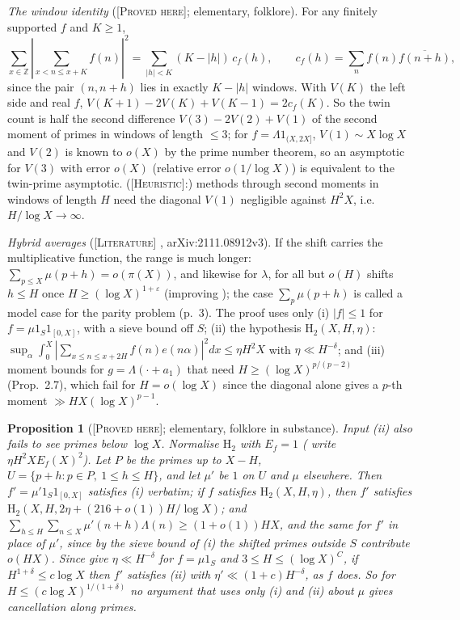 \documentclass[11pt]{amsart}
\newtheorem{proposition}[theorem]{Proposition}
\theoremstyle{definition}
\theoremstyle{remark}
\newcommand{\lbl}[1]{\textup{\textsc{[#1]}}}
\begin{document}
\emph{The window identity} (\lbl{Proved here}; elementary, folklore). For any
finitely supported $f$ and $K\ge1$,
\begin{equation}\label{eq:window}
\sum_{x\in\mathbb Z}\left|\sum_{x<n\le x+K}f(n)\right|^2=\sum_{|h|<K}(K-|h|)\,c_f(h),\qquad
c_f(h)=\sum_nf(n)\overline{f(n+h)},
\end{equation}
since the pair $(n,n+h)$ lies in exactly $K-|h|$ windows. With $V(K)$ the left
side and real $f$, $V(K+1)-2V(K)+V(K-1)=2c_f(K)$. So the twin count is half the
second difference $V(3)-2V(2)+V(1)$ of the second moment of primes in windows
of length $\le3$; for $f=\Lambda1_{(X,2X]}$, $V(1)\sim X\log X$ and $V(2)$ is known to $o(X)$ by the
prime number theorem, so an asymptotic for
$V(3)$ with error $o(X)$ (relative error $o(1/\log X)$) is equivalent to the
twin-prime asymptotic. (\lbl{Heuristic}:) methods through second moments in windows of length $H$
need the diagonal $V(1)$ negligible against $H^2X$, i.e.\ $H/\log X\to\infty$.

\emph{Hybrid averages} (\lbl{Literature} \cite[Thm.~1.2, Cor.~1.4, Prop.~3.2,
\S4]{LT22}, arXiv:2111.08912v3). If the shift carries the multiplicative
function, the range is much longer: $\sum_{p\le X}\mu(p+h)=o(\pi(X))$, and
likewise for $\lambda$, for all but $o(H)$ shifts $h\le H$ once $H\ge(\log
X)^{1+\varepsilon}$ (improving \cite{Li21}); the case $\sum_p\mu(p+h)$ is called a
model case for the parity problem (p.~3). The proof uses only (i) $|f|\le1$ for
$f=\mu1_S1_{[0,X]}$, with a sieve bound off $S$; (ii) the hypothesis
$\mathrm{H}_2(X,H,\eta)$:
$\sup_\alpha\int_0^X|\sum_{x\le n\le x+2H}f(n)e(n\alpha)|^2dx\le\eta H^2X$ with
$\eta\ll H^{-\delta}$; and (iii) moment bounds for $g=\Lambda(\cdot+a_1)$ that need
$H\ge(\log X)^{p/(p-2)}$ (Prop.~2.7), which fail for $H=o(\log X)$ since the
diagonal alone gives a $p$-th moment $\gg HX(\log X)^{p-1}$.

\begin{proposition}[\lbl{Proved here}; elementary, folklore in substance]\label{prop:lt22}
Input (ii) also fails to see primes below $\log X$. Normalise $\mathrm{H}_2$
with $E_f=1$ (\cite{LT22} write $\eta H^2XE_f(X)^2$). Let $P$ be the primes up to
$X-H$, $U=\{p+h:p\in P,\ 1\le h\le H\}$, and let $\mu'$ be $1$ on $U$ and $\mu$
elsewhere. Then $f'=\mu'1_S1_{[0,X]}$ satisfies (i) verbatim; if $f$ satisfies
$\mathrm{H}_2(X,H,\eta)$, then $f'$ satisfies $\mathrm{H}_2(X,H,2\eta+(216+o(1))H/\log X)$;
and $\sum_{h\le H}\sum_{n\le X}\mu'(n+h)\Lambda(n)\ge(1+o(1))HX$, and the same for
$f'$ in place of $\mu'$, since by the sieve bound of (i) the shifted primes
outside $S$ contribute $o(HX)$. Since
\cite[Prop.~2.1, Remark~2.2]{LT22} give $\eta\ll H^{-\delta}$ for $f=\mu1_S$ and
$3\le H\le(\log X)^C$, if $H^{1+\delta}\le c\log X$ then $f'$ satisfies (ii) with
$\eta'\ll(1+c)H^{-\delta}$, as $f$ does. So for $H\le(c\log X)^{1/(1+\delta)}$ no argument that uses
only (i) and (ii) about $\mu$ gives cancellation along primes.
\end{proposition}
\end{document}
